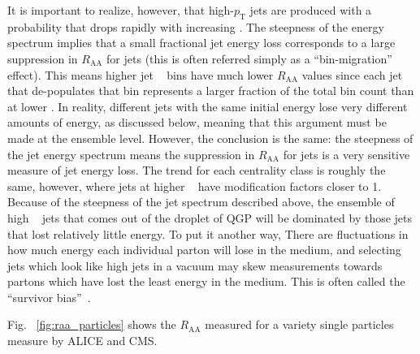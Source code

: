   It is important to realize, however, that high-$p_\mathrm{T}$ jets are produced with a probability that drops rapidly with increasing \pT \cite{Acharya2020}. The steepness of the energy spectrum implies that a small fractional jet energy loss corresponds to a large suppression in $R_\mathrm{AA}$ for jets (this is often referred simply as a ``bin-migration'' effect). This means higher jet \pT~ bins have much lower $R_\mathrm{AA}$ values since each jet that de-populates that bin represents a larger fraction of the total bin count than at lower \pT. In reality, different jets with the same initial energy lose very different amounts of energy, as discussed below, meaning that this argument must be made at the ensemble level. However, the conclusion is the same: the steepness of the jet energy spectrum means the suppression in $R_\mathrm{AA}$ for jets is a very sensitive measure of jet energy loss. 
  The trend for each centrality class is roughly the same, however, where jets at higher \pT~ have modification factors closer to 1. Because of the steepness of the jet spectrum described above, the ensemble of high \pT~ jets that comes out of the droplet of QGP will be dominated by those jets that lost relatively little energy. To put it another way, There are fluctuations in how much energy each individual parton will lose in the medium, and selecting jets which look like high \pt jets in a vacuum may skew measurements towards partons which have lost the least energy in the medium. This is often called the ``survivor bias''~\cite{Connors2018}.

  Fig.~ \ref{fig:raa_particles} shows the $R_\mathrm{AA}$ measured for a variety single particles \cite{Bencedi2016} measure by ALICE and CMS. 

